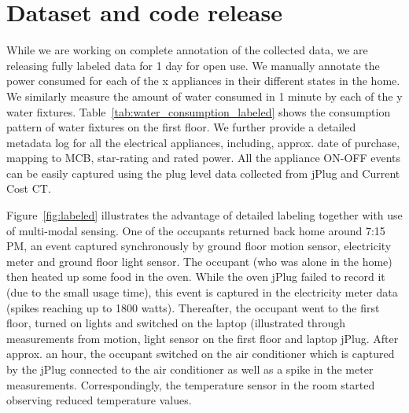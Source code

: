 \documentclass[10pt]{sensys-proc}
\newcommand{\figref}[1]{Figure~\ref{#1}}
\newcommand{\tabref}[1]{Table~\ref{#1}}
\begin{document}
\vspace{-1mm}
\section{Dataset and code release}
While we are working on complete annotation of the collected data, we are releasing fully labeled data for 1 day for open use. %
We manually annotate the power consumed for each of the x appliances in their different states in the home. We similarly measure the amount of water consumed in 1 minute by each of the y water fixtures. \tabref{tab:water_consumption_labeled} shows the consumption pattern of water fixtures on the first floor. We further provide a detailed metadata log for all the electrical appliances, including, approx. date of purchase, mapping to MCB, star-rating and rated power. All the appliance ON-OFF events can be easily captured using the plug level data collected from jPlug and Current Cost CT. 

\figref{fig:labeled} illustrates the advantage of detailed labeling together with use of multi-modal sensing. One of the occupants returned back home around 7:15 PM, an event captured synchronously by ground floor motion sensor, electricity meter and ground floor light sensor. The occupant (who was alone in the home) then heated up some food in the oven. While the oven jPlug failed to record it (due to the small usage time), this event is captured in the electricity meter data (spikes reaching up to 1800 watts). Thereafter, the occupant went to the first floor, turned on lights and switched on the laptop (illustrated through measurements from motion, light sensor on the first floor and laptop jPlug. After approx. an hour, the occupant switched on the air conditioner which is captured by the jPlug connected to the air conditioner as well as a spike in the meter measurements. Correspondingly, the temperature sensor in the room started observing reduced temperature values. 
 
\end{document}
